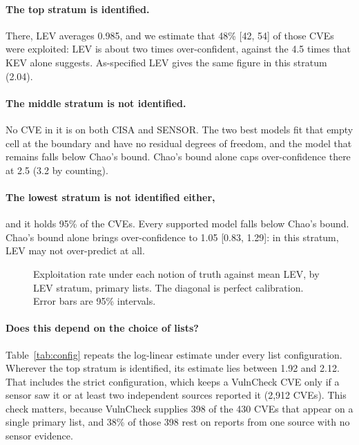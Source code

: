 \paragraph{The top stratum is identified.} There, LEV averages 0.985, and we
estimate that 48\% [42, 54] of those CVEs were exploited: LEV is about two times
over-confident, against the 4.5 times that KEV alone suggests. As-specified LEV
gives the same figure in this stratum (2.04).

\paragraph{The middle stratum is not identified.} No CVE in it is on both CISA
and SENSOR. The two best models fit that empty cell at the boundary and have no
residual degrees of freedom, and the model that remains falls below Chao's
bound. Chao's bound alone caps over-confidence there at 2.5 (3.2 by counting).

\paragraph{The lowest stratum is not identified either,} and it holds 95\% of
the CVEs. Every supported model falls below Chao's bound. Chao's bound alone
brings over-confidence to 1.05 [0.83, 1.29]: in this stratum, LEV may not
over-predict at all.

\begin{figure}[t]
\centering
{}
\caption{Exploitation rate under each notion of truth against mean LEV, by LEV
stratum, primary lists. The diagonal is perfect calibration. Error bars are
95\% intervals.}\label{fig:cr}
\end{figure}

\paragraph{Does this depend on the choice of lists?} Table~\ref{tab:config}
repeats the log-linear estimate under every list configuration. Wherever the top
stratum is identified, its estimate lies between 1.92 and 2.12. That includes
the strict configuration, which keeps a VulnCheck CVE only if a sensor saw it
or at least two independent sources reported it (2,912 CVEs). This check
matters, because VulnCheck supplies 398 of the 430 CVEs that appear on a
single primary list, and 38\% of those 398 rest on reports from one source with
no sensor evidence.

